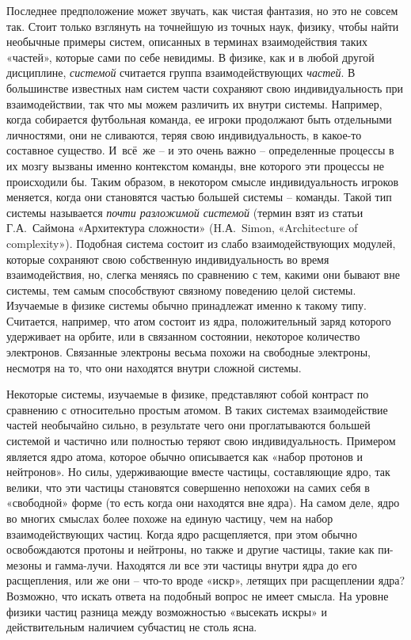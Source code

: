 \documentclass[../main.tex]{subfiles}
\begin{document}
Последнее предположение может звучать, как чистая фантазия, но это не совсем так. Стоит только взглянуть на точнейшую из точных наук, физику, чтобы найти необычные примеры систем, описанных в терминах взаимодействия таких «частей», которые сами по себе невидимы. В физике, как и в любой другой дисциплине, \emph{системой} считается группа взаимодействующих \emph{частей}. В большинстве известных нам систем части сохраняют свою индивидуальность при взаимодействии, так что мы можем различить их внутри системы. Например, когда собирается футбольная команда, ее игроки продолжают быть отдельными личностями, они не сливаются, теряя свою индивидуальность, в какое-то составное существо. И~всё~же \--- и это очень важно \--- определенные процессы в их мозгу вызваны именно контекстом команды, вне которого эти процессы не происходили бы. Таким образом, в некотором смысле индивидуальность игроков меняется, когда они становятся частью большей системы \--- команды. Такой тип системы называется \emph{почти разложимой системой} (термин взят из статьи Г.А.~Саймона «Архитектура сложности» (H.А.~Simon, «Architecture of complexity»). Подобная система состоит из слабо взаимодействующих модулей, которые сохраняют свою собственную индивидуальность во время взаимодействия, но, слегка меняясь по сравнению с тем, какими они бывают вне системы, тем самым способствуют связному поведению целой системы. Изучаемые в физике системы обычно принадлежат именно к такому типу. Считается, например, что атом состоит из ядра, положительный заряд которого удерживает на орбите, или в связанном состоянии, некоторое количество электронов. Связанные электроны весьма похожи на свободные электроны, несмотря на то, что они находятся внутри сложной системы.

Некоторые системы, изучаемые в физике, представляют собой контраст по сравнению с относительно простым атомом. В таких системах взаимодействие частей необычайно сильно, в результате чего они проглатываются большей системой и частично или полностью теряют свою индивидуальность. Примером является ядро атома, которое обычно описывается как «набор протонов и нейтронов». Но силы, удерживающие вместе частицы, составляющие ядро, так велики, что эти частицы становятся совершенно непохожи на самих себя в «свободной» форме (то есть когда они находятся вне ядра). На самом деле, ядро во многих смыслах более похоже на единую частицу, чем на набор взаимодействующих частиц. Когда ядро расщепляется, при этом обычно освобождаются протоны и нейтроны, но также и другие частицы, такие как пи-мезоны и гамма-лучи. Находятся ли все эти частицы внутри ядра до его расщепления, или же они \--- что-то вроде «искр», летящих при расщеплении ядра? Возможно, что искать ответа на подобный вопрос не имеет смысла. На уровне физики частиц разница между возможностью «высекать искры» и действительным наличием субчастиц не столь ясна.
\end{document}
